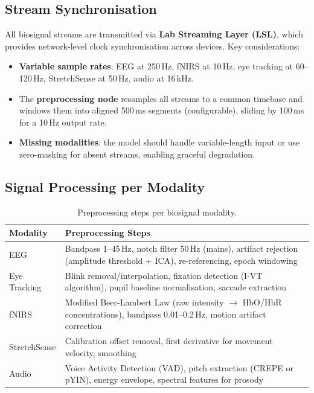 \documentclass[11pt,a4paper]{article}
\begin{document}
\subsection{Stream Synchronisation}

All biosignal streams are transmitted via \textbf{Lab Streaming Layer (LSL)}, which provides network-level clock synchronisation across devices. Key considerations:

\begin{itemize}[leftmargin=1.5em]
  \item \textbf{Variable sample rates}: EEG at 250\,Hz, fNIRS at 10\,Hz, eye tracking at 60--120\,Hz, StretchSense at 50\,Hz, audio at 16\,kHz.
  \item The \textbf{preprocessing node} resamples all streams to a common timebase and windows them into aligned 500\,ms segments (configurable), sliding by 100\,ms for a 10\,Hz output rate.
  \item \textbf{Missing modalities}: the model should handle variable-length input or use zero-masking for absent streams, enabling graceful degradation.
\end{itemize}

\subsection{Signal Processing per Modality}

\begin{table}[H]
\centering
\caption{Preprocessing steps per biosignal modality.}
\label{tab:preprocessing}
\begin{tabularx}{\textwidth}{lX}
\toprule
\textbf{Modality} & \textbf{Preprocessing Steps} \\
\midrule
EEG & Bandpass 1--45\,Hz, notch filter 50\,Hz (mains), artifact rejection (amplitude threshold + ICA), re-referencing, epoch windowing \\
Eye Tracking & Blink removal/interpolation, fixation detection (I-VT algorithm), pupil baseline normalisation, saccade extraction \\
fNIRS & Modified Beer-Lambert Law (raw intensity $\rightarrow$ HbO/HbR concentrations), bandpass 0.01--0.2\,Hz, motion artifact correction \\
StretchSense & Calibration offset removal, first derivative for movement velocity, smoothing \\
Audio & Voice Activity Detection (VAD), pitch extraction (CREPE or pYIN), energy envelope, spectral features for prosody \\
\bottomrule
\end{tabularx}
\end{table}
\end{document}
